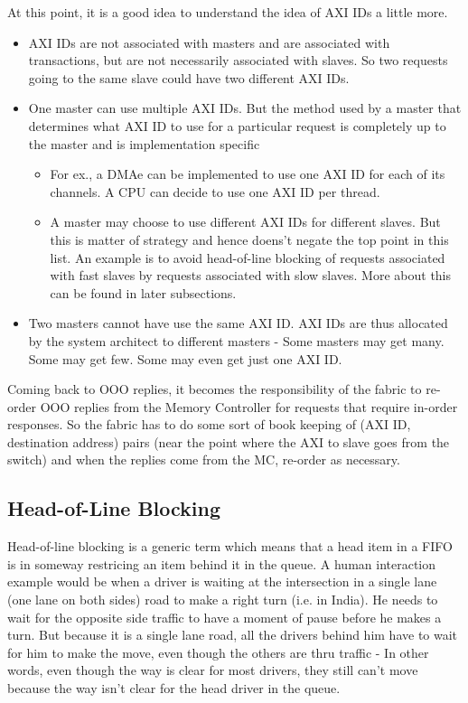 At this point, it is a good idea to understand the idea of AXI IDs a little more. 
	\begin{itemize}
	\item AXI IDs are not associated with masters and are associated with transactions, but are not necessarily associated with slaves. So two requests going to the same slave could have two different AXI IDs. 
	\item One master can use multiple AXI IDs. But the method used by a master that determines what AXI ID to use for a particular request is completely up to the master and is implementation specific
		\begin{itemize}
		\item For ex., a DMAe can be implemented to use one AXI ID for each of its channels. A CPU can decide to use one AXI ID per thread.
		\item A master may choose to use different AXI IDs for different slaves. But this is matter of strategy and hence doens't negate the top point in this list. An example is to avoid head-of-line blocking of requests associated with fast slaves by requests associated with slow slaves. More about this can be found in later subsections.
		\end{itemize}
	\item Two masters cannot have use the same AXI ID. AXI IDs are thus allocated by the system architect to different masters - Some masters may get many. Some may get few. Some may even get just one AXI ID.
	\end{itemize}
	
Coming back to OOO replies, it becomes the responsibility of the fabric to re-order OOO replies from the Memory Controller for requests that require in-order responses. So the fabric has to do some sort of book keeping of (AXI ID, destination address) pairs (near the point where the AXI to slave goes from the switch) and when the replies come from the MC, re-order as necessary.

\subsection{Head-of-Line Blocking}
Head-of-line blocking is a generic term which means that a head item in a FIFO is in someway restricing an item behind it in the queue. A human interaction example would be when a driver is waiting at the intersection in a single lane (one lane on both sides) road to make a right turn (i.e. in India). He needs to wait for the opposite side traffic to have a moment of pause before he makes a turn. But because it is a single lane road, all the drivers behind him have to wait for him to make the move, even though the others are thru traffic - In other words, even though the way is clear for most drivers, they still can't move because the way isn't clear for the head driver in the queue. 

